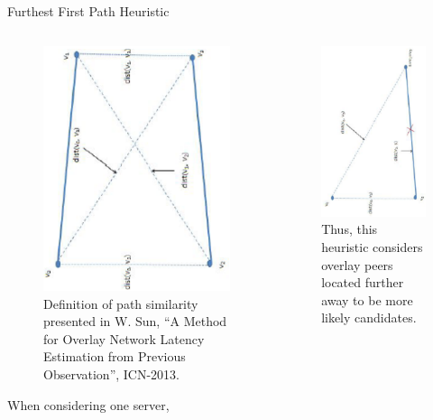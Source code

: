 \documentclass[pdftex]{beamer}
\begin{document}

\begin{frame}{Furthest First Path Heuristic}
\begin{columns}
\begin{column}{.5\textwidth}
\begin{figure}
\includegraphics[height=.6\textwidth,angle=-90]{path_similarity_two_destinations}
\caption{Definition of path similarity presented in W. Sun, ``A Method for Overlay Network Latency Estimation from Previous Observation'', ICN-2013.}
\end{figure}


\vspace{8pt}
When considering one server,
\vspace{8pt}

\end{column}
	
\begin{column}{.5\textwidth}
\begin{figure}
\includegraphics[height=.6\textwidth,angle=-90]{path_similarity_one_destination}
\caption{Thus, this heuristic considers overlay peers located further away to be more likely candidates.}
\end{figure}


\end{column}
\end{columns}
\end{frame}
\end{document}
